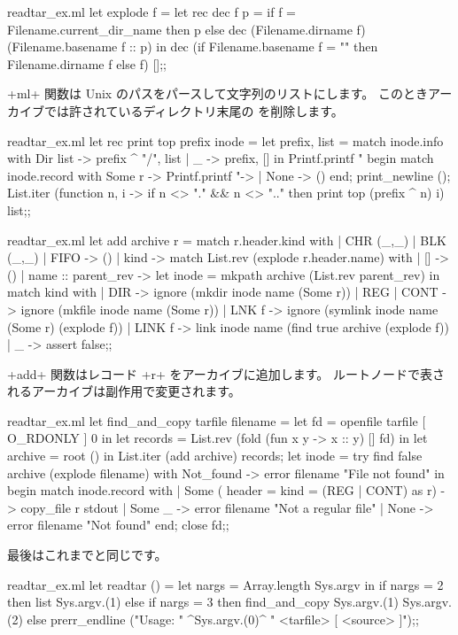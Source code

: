 \begin{answer}
%
\begin{listingcodefile}{readtar_ex.ml}
let explode f =
  let rec dec f p =
    if f = Filename.current_dir_name then p
    else dec (Filename.dirname f) (Filename.basename f :: p) in
  dec (if Filename.basename f = "" then Filename.dirname f else f) [];;
\end{listingcodefile}
%
\ml+ml+ 関数は Unix のパスをパースして文字列のリストにします。
このときアーカイブでは許されているディレクトリ末尾の \quotes{\ml+/+} を削除します。
%
\begin{codefile}{readtar_ex.ml}
let rec print top prefix inode  =
  let prefix, list =
    match inode.info
    with Dir list -> prefix ^ "/", list
    | _ -> prefix, [] in
  Printf.printf "%
  begin match inode.record with
    Some r ->  Printf.printf "-> %
  | None -> ()
  end;
  print_newline ();
  List.iter (function n, i ->
    if n <> "." && n <> ".." then  print top (prefix ^ n) i) list;;
\end{codefile}
%
\begin{listingcodefile}{readtar_ex.ml}
let add archive r =
  match r.header.kind with
  | CHR (_,_) | BLK (_,_) | FIFO -> ()
  | kind ->
      match List.rev (explode r.header.name) with
      | []  -> ()
      | name :: parent_rev ->
          let inode = mkpath archive (List.rev parent_rev) in
          match kind with
          | DIR -> ignore (mkdir inode name (Some r))
          | REG | CONT -> ignore (mkfile inode name (Some r))
          | LNK f -> ignore (symlink inode name (Some r) (explode f))
          | LINK f -> link inode name (find true archive (explode f))
          | _ -> assert false;;
\end{listingcodefile}
%
\ml+add+ 関数はレコード \ml+r+ をアーカイブに追加します。
ルートノードで表されるアーカイブは副作用で変更されます。
%
\begin{listingcodefile}{readtar_ex.ml}
let find_and_copy tarfile filename =
  let fd = openfile tarfile [ O_RDONLY ] 0 in
  let records = List.rev (fold (fun x y -> x :: y) [] fd) in
  let archive = root () in
  List.iter (add archive) records;
  let inode =
    try find false archive (explode filename)
    with Not_found -> error filename "File not found" in
  begin match inode.record with
  | Some ({ header = { kind = (REG | CONT) }} as r) -> copy_file r stdout
  | Some _ -> error filename "Not a regular file"
  | None -> error filename "Not found"
  end;
  close fd;;
\end{listingcodefile}
%
最後はこれまでと同じです。
\begin{listingcodefile}{readtar_ex.ml}
let readtar () =
  let nargs = Array.length Sys.argv in
  if nargs = 2 then list Sys.argv.(1)
  else if nargs = 3 then find_and_copy Sys.argv.(1) Sys.argv.(2)
  else prerr_endline ("Usage: " ^Sys.argv.(0)^ " <tarfile> [ <source> ]");;


\end{listingcodefile}
\end{answer}
